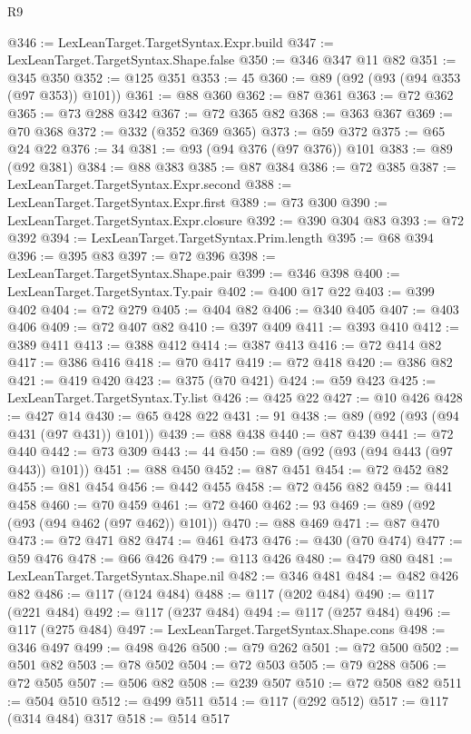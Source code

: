 \begin{lexlean}{R9}
\begin{coremodule}
@346 := LexLeanTarget.TargetSyntax.Expr.build
@347 := LexLeanTarget.TargetSyntax.Shape.false
@350 := @346 @347 @11 @82
@351 := @345 @350
@352 := @125 @351
@353 := 45
@360 := @89 (@92 (@93 (@94 @353 (@97 @353)) @101))
@361 := @88 @360
@362 := @87 @361
@363 := @72 @362
@365 := @73 @288 @342
@367 := @72 @365 @82
@368 := @363 @367
@369 := @70 @368
@372 := @332 (@352 @369 @365)
@373 := @59 @372
@375 := @65 @24 @22
@376 := 34
@381 := @93 (@94 @376 (@97 @376)) @101
@383 := @89 (@92 @381)
@384 := @88 @383
@385 := @87 @384
@386 := @72 @385
@387 := LexLeanTarget.TargetSyntax.Expr.second
@388 := LexLeanTarget.TargetSyntax.Expr.first
@389 := @73 @300
@390 := LexLeanTarget.TargetSyntax.Expr.closure
@392 := @390 @304 @83
@393 := @72 @392
@394 := LexLeanTarget.TargetSyntax.Prim.length
@395 := @68 @394
@396 := @395 @83
@397 := @72 @396
@398 := LexLeanTarget.TargetSyntax.Shape.pair
@399 := @346 @398
@400 := LexLeanTarget.TargetSyntax.Ty.pair
@402 := @400 @17 @22
@403 := @399 @402
@404 := @72 @279
@405 := @404 @82
@406 := @340 @405
@407 := @403 @406
@409 := @72 @407 @82
@410 := @397 @409
@411 := @393 @410
@412 := @389 @411
@413 := @388 @412
@414 := @387 @413
@416 := @72 @414 @82
@417 := @386 @416
@418 := @70 @417
@419 := @72 @418
@420 := @386 @82
@421 := @419 @420
@423 := @375 (@70 @421)
@424 := @59 @423
@425 := LexLeanTarget.TargetSyntax.Ty.list
@426 := @425 @22
@427 := @10 @426
@428 := @427 @14
@430 := @65 @428 @22
@431 := 91
@438 := @89 (@92 (@93 (@94 @431 (@97 @431)) @101))
@439 := @88 @438
@440 := @87 @439
@441 := @72 @440
@442 := @73 @309
@443 := 44
@450 := @89 (@92 (@93 (@94 @443 (@97 @443)) @101))
@451 := @88 @450
@452 := @87 @451
@454 := @72 @452 @82
@455 := @81 @454
@456 := @442 @455
@458 := @72 @456 @82
@459 := @441 @458
@460 := @70 @459
@461 := @72 @460
@462 := 93
@469 := @89 (@92 (@93 (@94 @462 (@97 @462)) @101))
@470 := @88 @469
@471 := @87 @470
@473 := @72 @471 @82
@474 := @461 @473
@476 := @430 (@70 @474)
@477 := @59 @476
@478 := @66 @426
@479 := @113 @426
@480 := @479 @80
@481 := LexLeanTarget.TargetSyntax.Shape.nil
@482 := @346 @481
@484 := @482 @426 @82
@486 := @117 (@124 @484)
@488 := @117 (@202 @484)
@490 := @117 (@221 @484)
@492 := @117 (@237 @484)
@494 := @117 (@257 @484)
@496 := @117 (@275 @484)
@497 := LexLeanTarget.TargetSyntax.Shape.cons
@498 := @346 @497
@499 := @498 @426
@500 := @79 @262
@501 := @72 @500
@502 := @501 @82
@503 := @78 @502
@504 := @72 @503
@505 := @79 @288
@506 := @72 @505
@507 := @506 @82
@508 := @239 @507
@510 := @72 @508 @82
@511 := @504 @510
@512 := @499 @511
@514 := @117 (@292 @512)
@517 := @117 (@314 @484) @317
@518 := @514 @517

\end{coremodule}
\end{lexlean}

